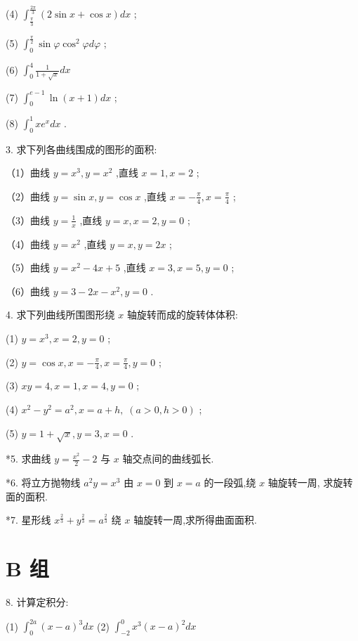 \documentclass[10pt]{article}
\begin{document}
(4) \({\int }_{\frac{\pi }{3}}^{\frac{2\pi }{3}}\left( {2\sin x + \cos x}\right) {dx}\) ;

(5) \({\int }_{0}^{\frac{\pi }{2}}\sin \varphi {\cos }^{2}{\varphi d\varphi }\) ;

(6) \({\int }_{0}^{4}\frac{1}{1 + \sqrt{x}}{dx}\)

(7) \({\int }_{0}^{e - 1}\ln \left( {x + 1}\right) {dx}\) ;

(8) \({\int }_{0}^{1}x{e}^{x}{dx}\) .

3. 求下列各曲线围成的图形的面积:

（1）曲线 \(y = {x}^{3},y = {x}^{2}\) ,直线 \(x = 1,x = 2\) ;

（2）曲线 \(y = \sin x,y = \cos x\) ,直线 \(x = - \frac{\pi }{4},x = \frac{\pi }{4}\) ;

（3）曲线 \(y = \frac{1}{x}\) ,直线 \(y = x,x = 2,y = 0\) ;

（4）曲线 \(y = {x}^{2}\) ,直线 \(y = x,y = {2x}\) ;

（5）曲线 \(y = {x}^{2} - {4x} + 5\) ,直线 \(x = 3,x = 5,y = 0\) ;

（6）曲线 \(y = 3 - {2x} - {x}^{2},y = 0\) .

4. 求下列曲线所围图形绕 \(x\) 轴旋转而成的旋转体体积:

(1) \(y = {x}^{3},x = 2,y = 0\) ;

(2) \(y = \cos x,x = - \frac{\pi }{4},x = \frac{\pi }{4},y = 0\) ;

(3) \({xy} = 4,x = 1,x = 4,y = 0\) ;

(4) \({x}^{2} - {y}^{2} = {a}^{2},x = a + h,\;\left( {a > 0,h > 0}\right)\) ;

(5) \(y = 1 + \sqrt{x},y = 3,x = 0\) .

*5. 求曲线 \(y = \frac{{x}^{2}}{2} - 2\) 与 \(x\) 轴交点间的曲线弧长.

*6. 将立方抛物线 \({a}^{2}y = {x}^{3}\) 由 \(x = 0\) 到 \(x = a\) 的一段弧,绕 \(x\) 轴旋转一周, 求旋转面的面积.

*7. 星形线 \({x}^{\frac{2}{3}} + {y}^{\frac{2}{3}} = {a}^{\frac{2}{3}}\) 绕 \(x\) 轴旋转一周,求所得曲面面积.

\section*{B 组}

8. 计算定积分:

(1) \({\int }_{0}^{2a}{\left( x - a\right) }^{3}{dx}\) (2) \({\int }_{-2}^{0}{x}^{3}{\left( x - a\right) }^{2}{dx}\)
\end{document}
